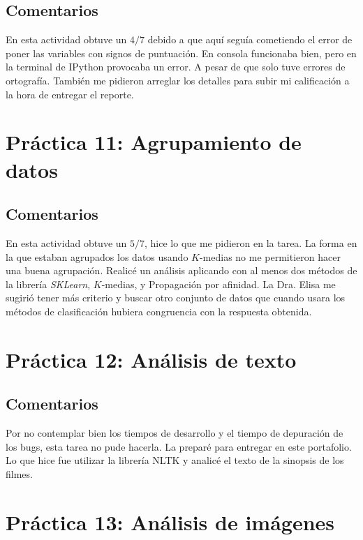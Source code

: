 \documentclass[12pt, letter]{report}
\begin{document}
\section*{Comentarios}
En esta actividad obtuve un $4/7$ debido a que aquí seguía cometiendo el error de poner las variables con signos de puntuación. En consola funcionaba bien, pero en la terminal de IPython provocaba un error. A pesar de que solo tuve errores de ortografía. También me pidieron arreglar los detalles para subir mi calificación a la hora de entregar el reporte.


\chapter*{Práctica 11: Agrupamiento de datos}

\section*{Comentarios}
En esta actividad obtuve un $5/7$, hice lo que me pidieron en la tarea. La forma en la que estaban agrupados los datos usando $K$-medias no me permitieron hacer una buena agrupación. Realicé un análisis aplicando con al menos dos métodos de la librería \textit{SKLearn}, $K$-medias, y Propagación por afinidad. La Dra. Elisa me sugirió tener más criterio y buscar otro conjunto de datos que cuando usara los métodos de clasificación hubiera congruencia con la respuesta obtenida.


\chapter*{Práctica 12: Análisis de texto}

\section*{Comentarios}
Por no contemplar bien los tiempos de desarrollo y el tiempo de depuración de los bugs, esta tarea no pude hacerla. La preparé para entregar en este portafolio. Lo que hice fue utilizar la librería NLTK y analicé el texto de la sinopsis de los filmes.


\chapter*{Práctica 13: Análisis de imágenes}

\end{document}
